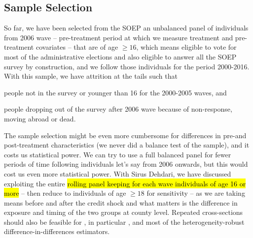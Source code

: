 \documentclass[11pt]{article}
\begin{document}

\subsection{Sample Selection}\label{sec:sample}

So far, we have been selected from the SOEP an unbalanced panel of individuals from 2006 wave -- pre-treatment period at which we measure treatment and pre-treatment covariates -- that are of age $\geq 16$, which means eligible to vote for most of the administrative elections and also eligible to answer all the SOEP survey by construction, and we follow those individuals for the period 2000-2016. With this sample, we have attrition at the tails such that
\begin{inlinelist}
    \item people not in the survey or younger than 16 for the 2000-2005 waves, and
    \item people dropping out of the survey after 2006 wave because of non-response, moving abroad or dead.
\end{inlinelist}
The sample selection might be even more cumbersome for differences in pre-and post-treatment characteristics (we never did a balance test of the sample), and it costs us statistical power. We can try to use a full balanced panel for fewer periods of time following individuals let's say from 2006 onwards, but this would cost us even more statistical power. With Sirus Dehdari, we have discussed exploiting the entire \hl{rolling panel keeping for each wave individuals of age 16 or more} -- then reduce to individuals of age $\geq 18$ for sensitivity -- as we are taking means before and after the credit shock and what matters is the difference in exposure and timing of the two groups at county level. Repeated cross-sections should also be feasible for \citet{bib:dechaisemartin2020}, in particular \citet{bib:dechaisemartin2022b}, and most of the heterogeneity-robust difference-in-differences estimators. 
\end{document}

